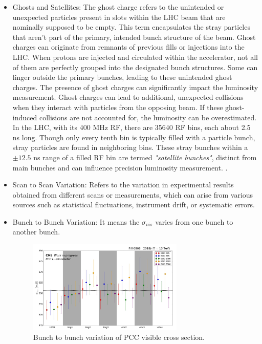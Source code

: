 \begin{itemize}
\item Ghosts and Satellites: The ghost charge refers to the unintended or unexpected particles present in slots within the LHC beam that are nominally supposed to be empty. This term encapsulates the stray particles that aren't part of the primary, intended bunch structure of the beam. Ghost charges can originate from remnants of previous fills or injections into the LHC. When protons are injected and circulated within the accelerator, not all of them are perfectly grouped into the designated bunch structures. Some can linger outside the primary bunches, leading to these unintended ghost charges. The presence of ghost charges can significantly impact the luminosity measurement. Ghost charges can lead to additional, unexpected collisions when they interact with particles from the opposing beam. If these ghost-induced collisions are not accounted for, the luminosity can be overestimated. In the LHC, with its 400 MHz RF, there are 35640 RF bins, each about 2.5 ns long. Though only every tenth bin is typically filled with a particle bunch, stray particles are found in neighboring bins. These stray bunches within a \(\pm 12.5 \) ns range of a filled RF bin are termed \textit{"satellite bunches"}, distinct from main bunches and can influence precision luminosity measurement.
 \cite{Alici:1427728}.


\item Scan to Scan Variation: Refers to the variation in experimental results obtained from different scans or measurements, which can arise from various sources such as statistical fluctuations, instrument drift, or systematic errors.

\item Bunch to Bunch Variation: It means the $\sigma_{vis}$  varies from one bunch to another bunch.


\begin{figure}[!htp]
\centering
\includegraphics[width=0.7\textwidth]{ashish_thesis/sigma_vis_btob_var_1.png}
\caption[$\sigma_{vis}$ Bunch Variation]{%
 Bunch to bunch variation of PCC visible cross section.  
}
\label{fig:sigmavis_btob_variation}
\end{figure}


\end{itemize}
